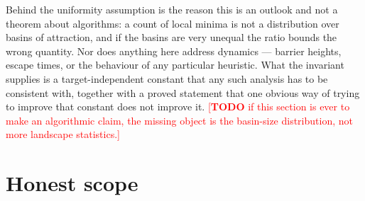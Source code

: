 \documentclass[11pt,a4paper]{article}
\theoremstyle{plain}
\theoremstyle{definition}
\theoremstyle{remark}
\newcommand{\TODO}[1]{\textcolor{red}{[\textbf{TODO} #1]}}
\begin{document}
Behind the uniformity assumption is the reason this is an outlook and not a theorem about
algorithms: a count of local minima is not a distribution over basins of attraction, and if
the basins are very unequal the ratio bounds the wrong quantity. Nor does anything here
address dynamics --- barrier heights, escape times, or the behaviour of any particular
heuristic. What the invariant supplies is a target-independent constant that any such analysis
has to be consistent with, together with a proved statement that one obvious way of trying to
improve that constant does not improve it.
\TODO{if this section is ever to make an algorithmic claim, the missing object is the
basin-size distribution, not more landscape statistics.}

\section{Honest scope}\label{sec:scope}
\end{document}
